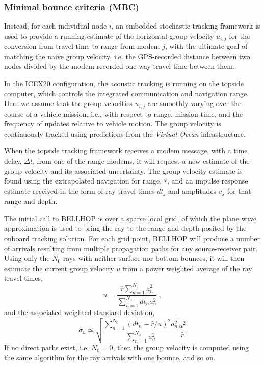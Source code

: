 \subsubsection{Minimal bounce criteria (MBC)}
Instead, for each individual node $i$, an embedded stochastic tracking framework is used to provide a running estimate of the horizontal group velocity $u_{i,j}$ for the conversion from travel time to range from modem $j$, with the ultimate goal of matching the naive group velocity, i.e. the GPS-recorded distance between two nodes divided by the modem-recorded one way travel time between them. 

In the ICEX20 configuration, the acoustic tracking is running on the topside computer, which controls the integrated communication and navigation range.
Here we assume that the group velocities $u_{i,j}$ are smoothly varying over the course of a vehicle mission, i.e., with respect to range, mission time, and the frequency of updates relative to vehicle motion. 
The group velocity is continuously tracked using predictions from the \textit{Virtual Ocean} infrastructure.

When the topside tracking framework receives a modem message, with a time delay, $\Delta t$, from one of the range modems, it will request a new estimate of the group velocity and its associated uncertainty.
The group velocity estimate is found using the extrapolated navigation for range, $\hat{r}$, and an impulse response estimate received in the form of ray travel times $dt_{j}$ and amplitudes $a_{j}$ for that range and depth.

The initial call to BELLHOP is over a sparse local grid, of which the plane wave approximation is used to bring the ray to the range and depth posited by the onboard tracking solution.
For each grid point, BELLHOP will produce a number of arrivals resulting from multiple propagation paths for any source-receiver pair.
Using only the $N_0$ rays with neither surface nor bottom bounces, it will then estimate the current group velocity $u$ from a power weighted average of the ray travel times,
\begin{equation}
u = \frac{\hat{r} \sum_{n=1}^{N_{0}} a_{n}^{2}}{\sum_{n=1}^{N_{0}} dt_{n}a_{n}^{2}} ~, 
\end{equation}
and the associated weighted standard deviation,
\begin{equation}
\sigma_{u} \simeq \sqrt{\frac {\sum_{n=1}^{N_{0}} (dt_{n}-\hat{r}/u)^{2}a_{n}^{2}}{ \sum_{n=1}^{N_{0}} a_{n}^{2}} } \frac{u^{2}}{\hat{r}}
\end{equation}
If no direct paths exist, i.e. $N_{0}=0$, then the group velocity is computed using the same algorithm for the ray arrivals with one bounce, and so on.

